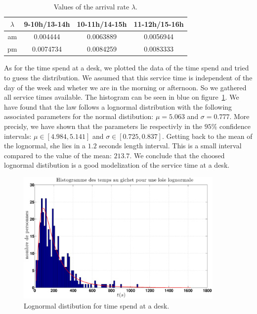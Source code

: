 \documentclass[12pt,a4paper,notitlepage]{report}
\begin{document}
\begin{table}
\centering
\begin{tabular}{|c|c|c|c|}
\hline 
$\lambda$ & 9-10h/13-14h & 10-11h/14-15h & 11-12h/15-16h \\ 
\hline 
am & 0.004444 & 0.0063889 & 0.0056944 \\ 
\hline 
pm & 0.0074734 & 0.0084259 & 0.0083333 \\ 
\hline 
\end{tabular}
\caption{Values of the arrival rate $\lambda$.} 
\end{table}

As for the time spend at a desk, we plotted the data of the time spend and tried to guess the distribution. We assumed that this service time is independent of the day of the week and wheter we are in the morning or afternoon. So we gathered all service times available. The histogram can be seen in blue on figure~\ref{lognormal}. We have found that the law follows a lognormal distribution with the following associated parameters for the normal distibution: $\mu= 5.063$ and $\sigma= 0.777$. More precisly, we have shown that the parameters lie respectivly in the $95 \% $ confidence intervals: $\mu \in [ 4.984 , 5.141 ]$ and $\sigma \in [ 0.725 , 0.837]$. Getting back to the mean of the lognormal, she lies in a $1.2$ seconds length interval. This is a small interval compared to the value of the mean: $ 213.7$. We conclude that the choosed lognormal distibution is a good modelization of the service time at a desk.

\begin{figure}[!h]
\centering
\includegraphics[width = 0.9\textwidth]{../matlab/eps/hist_lognormal.eps}
\caption{Lognormal distibution for time spend at a desk.}
\label{lognormal}
\end{figure}
\end{document}
